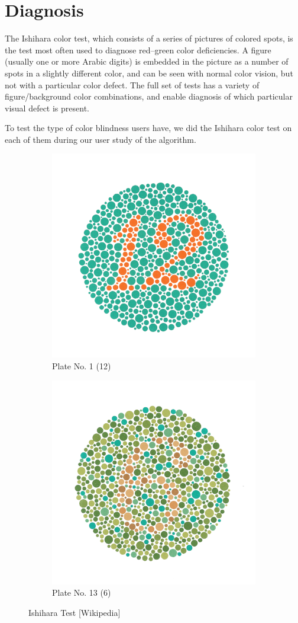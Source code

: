\section{Diagnosis}
\label{Diagnosis}

The Ishihara color test, which consists of a series of pictures of colored spots, is the test most often used to diagnose red–green color deficiencies. A figure (usually one or more Arabic digits) is embedded in the picture as a number of spots in a slightly different color, and can be seen with normal color vision, but not with a particular color defect. The full set of tests has a variety of figure/background color combinations, and enable diagnosis of which particular visual defect is present.

To test the type of color blindness users have, we did the Ishihara color test on each of them during our user study of the algorithm.


\begin{figure}
\centering
\begin{subfigure}{.5\textwidth}
  \centering
  \includegraphics[width=.5\linewidth]{Ishihara1.PNG}
  \caption{Plate No. 1 (12)}
  \label{fig:sub1}
\end{subfigure}%
\begin{subfigure}{.5\textwidth}
  \centering
  \includegraphics[width=.5\linewidth]{Ishihara2.PNG}
  \caption{Plate No. 13 (6)}
  \label{fig:sub2}
\end{subfigure}
\caption{Ishihara Test [Wikipedia]}
\label{fig:test}
\end{figure}

